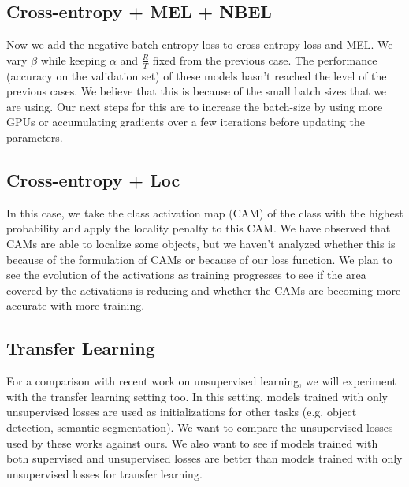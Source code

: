 \documentclass[runningheads]{llncs}
\begin{document}
\subsection{Cross-entropy + MEL + NBEL}
Now we add the negative batch-entropy loss to cross-entropy loss and MEL. We vary $\beta$ while
keeping $\alpha$ and $\frac{R}{T}$ fixed from the previous case. The performance (accuracy on the
validation set) of these models hasn't reached the level of the previous cases. We
believe that this is because of the small batch sizes that we are using. Our next steps for this are
to increase the batch-size by using more GPUs or accumulating gradients over a few iterations before
updating the parameters.

\subsection{Cross-entropy + Loc}
In this case, we take the class activation map (CAM) of the class with the highest probability and
apply the locality penalty to this CAM. We have observed that CAMs
are able to localize some objects, but we haven't analyzed whether this is because of the
formulation of CAMs or because of our loss function. We plan to see the evolution of the
activations as training progresses to see if the area covered by the activations is reducing and
whether the CAMs are becoming more accurate with more training. 

\subsection{Transfer Learning}
For a comparison with recent work on unsupervised learning, we will experiment
with the transfer learning setting too. In this setting, models trained with only unsupervised
losses are used as initializations for other tasks (e.g. object detection, semantic segmentation).
We want to compare the unsupervised losses used by these works against ours. We also want to see if
models trained with both supervised and unsupervised losses are better than models trained with only
unsupervised losses for transfer learning. 



\end{document}
